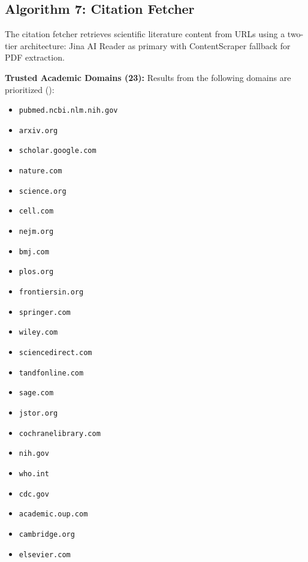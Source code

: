 \subsection{Algorithm 7: Citation Fetcher}
\label{alg:citation_fetcher}

The citation fetcher retrieves scientific literature content from URLs using a two-tier architecture: Jina AI Reader as primary with ContentScraper fallback for PDF extraction.

\vspace{0.25em}
\noindent\textbf{Trusted Academic Domains (23):} Results from the following domains are prioritized (\cite{bravesearchapi}):
\begin{itemize}[noitemsep]
    \item \texttt{pubmed.ncbi.nlm.nih.gov}
    \item \texttt{arxiv.org}
    \item \texttt{scholar.google.com}
    \item \texttt{nature.com}
    \item \texttt{science.org}
    \item \texttt{cell.com}
    \item \texttt{nejm.org}
    \item \texttt{bmj.com}
    \item \texttt{plos.org}
    \item \texttt{frontiersin.org}
    \item \texttt{springer.com}
    \item \texttt{wiley.com}
    \item \texttt{sciencedirect.com}
    \item \texttt{tandfonline.com}
    \item \texttt{sage.com}
    \item \texttt{jstor.org}
    \item \texttt{cochranelibrary.com}
    \item \texttt{nih.gov}
    \item \texttt{who.int}
    \item \texttt{cdc.gov}
    \item \texttt{academic.oup.com}
    \item \texttt{cambridge.org}
    \item \texttt{elsevier.com}
\end{itemize}

